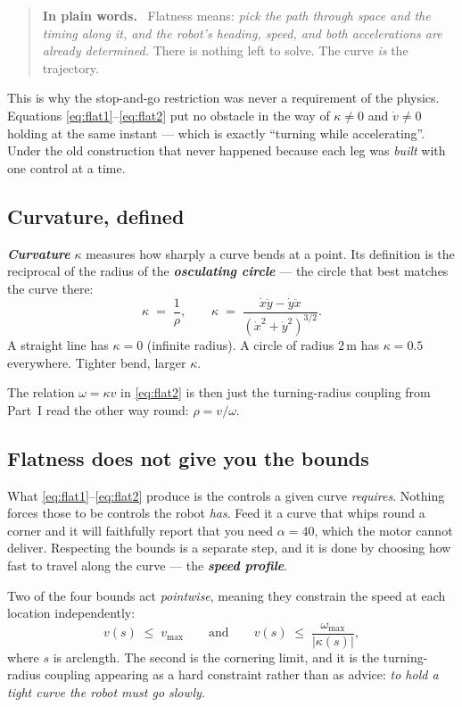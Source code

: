 \documentclass[11pt,a4paper]{article}
\newcommand{\defn}[1]{\textbf{\textit{#1}}}
\newenvironment{keypoint}
  {\begin{quote}\small\noindent\textbf{In plain words.}\ }
  {\end{quote}}
\begin{document}
\begin{keypoint}
Flatness means: \emph{pick the path through space and the timing along it, and the robot's
heading, speed, and both accelerations are already determined.} There is nothing left to
solve. The curve \emph{is} the trajectory.
\end{keypoint}

This is why the stop-and-go restriction was never a requirement of the physics. Equations
\eqref{eq:flat1}--\eqref{eq:flat2} put no obstacle in the way of $\kappa \ne 0$ and
$\dot{v} \ne 0$ holding at the same instant --- which is exactly ``turning while
accelerating''. Under the old construction that never happened because each leg was
\emph{built} with one control at a time.

\subsection{Curvature, defined}

\defn{Curvature} $\kappa$ measures how sharply a curve bends at a point. Its definition is
the reciprocal of the radius of the \defn{osculating circle} --- the circle that best
matches the curve there:
\[
\kappa \;=\; \frac{1}{\rho}, \qquad
\kappa \;=\; \frac{\dot{x}\ddot{y} - \dot{y}\ddot{x}}{(\dot{x}^2+\dot{y}^2)^{3/2}} .
\]
A straight line has $\kappa = 0$ (infinite radius). A circle of radius $2$\,m has
$\kappa = 0.5$ everywhere. Tighter bend, larger $\kappa$.

The relation $\omega = \kappa v$ in \eqref{eq:flat2} is then just the turning-radius
coupling from Part~I read the other way round: $\rho = v/\omega$.

\subsection{Flatness does not give you the bounds}

What \eqref{eq:flat1}--\eqref{eq:flat2} produce is the controls a given curve
\emph{requires}. Nothing forces those to be controls the robot \emph{has}. Feed it a curve
that whips round a corner and it will faithfully report that you need $\alpha = 40$, which
the motor cannot deliver. Respecting the bounds is a separate step, and it is done by
choosing how fast to travel along the curve --- the \defn{speed profile}.

Two of the four bounds act \emph{pointwise}, meaning they constrain the speed at each
location independently:
\[
v(s) \;\le\; v_{\max}
\qquad\text{and}\qquad
v(s) \;\le\; \frac{\omega_{\max}}{|\kappa(s)|},
\]
where $s$ is arclength. The second is the cornering limit, and it is the turning-radius
coupling appearing as a hard constraint rather than as advice: \emph{to hold a tight curve
the robot must go slowly}.
\end{document}
